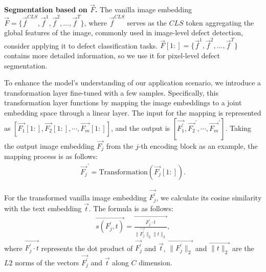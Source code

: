 \noindent
\textbf{Segmentation based on $\vec{F}$.}
The vanilla image embedding $ \vec{F} = \{\vec{f}^{CLS}, \vec{f}^1, \vec{f}^2, \ldots, \vec{f}^T \} $, where $ \vec{f}^{CLS}$ serves as the $CLS$ token aggregating the global features of the image, commonly used in image-level defect detection, consider applying it to defect classification tasks. 
$ \vec {F}[1:] = \{\vec{f}^1, \vec{f}^2, \ldots, \vec{f}^T\} $ contains more detailed information, so we use it for pixel-level defect segmentation. 

To enhance the model's understanding of our application scenario, we introduce a transformation layer fine-tuned with a few samples. Specifically, this transformation layer functions by mapping the image embeddings to a joint embedding space through a linear layer. The input for the mapping is represented as $[\vec{F_{1}}[1:], \vec{F_{2}}[1:], \cdots, \vec{F_{m}}[1:]]$, and the output is $[\vec{F_{1}^{'}}, \vec{F_{2}}^{'}, \cdots, \vec{F_{m}}^{'}]$. Taking the output image embedding $\vec{F_{j}}$ from the $j$-th encoding block as an example, the mapping process is as follows:
\begin{align}
\vec{F_{j}}^{'}=\text{Transformation}(\vec{F_{j}}[1:]).
\end{align}

For the transformed vanilla image embedding $\vec{F_{j}^{'}}$, we calculate its cosine similarity with the text embedding $\vec{t}$. The formula is as follows:
\begin{align}
\vec{s(F_{j}^{'}, t)} = \vec{\frac{F_{j}^{'} \cdot t}{\|\vec{F_{j}^{'}}\|_{2} \|t\|_{2}}},
\label{eq:similarity}
\end{align}
where $ \vec{F_{j}^{'} \cdot t} $ represents the dot product of $ \vec{F_{j}^{'}}$ and $ \vec{t}$, $ \vec{ \|F_{j}^{'}\|_{2} } $ and $\vec{ \|t\|_{2} }$ are the $L2$ norms of the vectors $\vec{F_{j}^{'}}$ and $ \vec{t}$ along $C$ dimension. 


